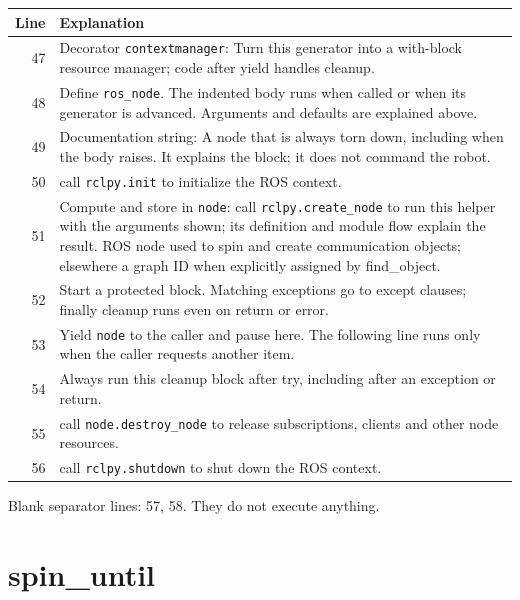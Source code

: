 \documentclass[11pt,a4paper]{book}
\begin{document}
\begin{longtable}{r p{}}

\textbf{Line} & \textbf{Explanation} \\ \hline \endhead

47 & Decorator \texttt{contextmanager}: Turn this generator into a with-block resource manager; code after yield handles cleanup. \\

48 & Define \texttt{ros\_node}. The indented body runs when called or when its generator is advanced. Arguments and defaults are explained above. \\

49 & Documentation string: A node that is always torn down, including when the body raises. It explains the block; it does not command the robot. \\

50 & call \texttt{rclpy.init} to initialize the ROS context. \\

51 & Compute and store in \texttt{node}: call \texttt{rclpy.create\_node} to run this helper with the arguments shown; its definition and module flow explain the result. ROS node used to spin and create communication objects; elsewhere a graph ID when explicitly assigned by find\_object. \\

52 & Start a protected block. Matching exceptions go to except clauses; finally cleanup runs even on return or error. \\

53 & Yield \texttt{node} to the caller and pause here. The following line runs only when the caller requests another item. \\

54 & Always run this cleanup block after try, including after an exception or return. \\

55 & call \texttt{node.destroy\_node} to release subscriptions, clients and other node resources. \\

56 & call \texttt{rclpy.shutdown} to shut down the ROS context. \\

\end{longtable}

Blank separator lines: 57, 58. They do not execute anything.

\section{spin\_until}
\end{document}
